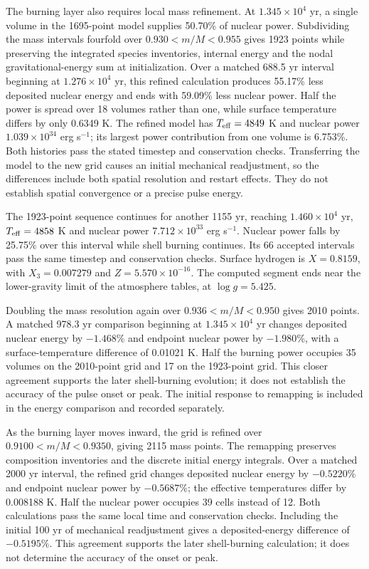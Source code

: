 \documentclass[11pt,letterpaper]{article}
\begin{document}
The burning layer also requires local mass refinement. At
$1.345\times10^4$ yr, a single volume in the 1695-point model supplies
50.70\% of nuclear power. Subdividing the mass intervals fourfold over
$0.930<m/M<0.955$ gives 1923 points while preserving the integrated species
inventories, internal energy and the nodal gravitational-energy sum at
initialization. Over a matched 688.5 yr interval beginning at
$1.276\times10^4$ yr, this refined calculation produces 55.17\% less deposited
nuclear energy and ends with 59.09\% less nuclear power. Half the power is
spread over 18 volumes rather than one, while surface temperature differs
by only 0.6349 K. The refined model has $T_{\rm eff}=4849$ K and nuclear power
$1.039\times10^{34}$ erg s$^{-1}$; its largest power contribution from
one volume is 6.753\%. Both histories pass the stated timestep and conservation
checks. Transferring the model to the new grid causes an initial mechanical
readjustment, so the differences include both spatial resolution and restart
effects. They do not establish spatial convergence or a precise pulse energy.

The 1923-point sequence continues for another 1155 yr, reaching
$1.460\times10^4$ yr, $T_{\rm eff}=4858$ K and nuclear power
$7.712\times10^{33}$ erg s$^{-1}$. Nuclear power falls by 25.75\%
over this interval while shell burning continues. Its 66 accepted intervals
pass the same timestep and conservation checks. Surface hydrogen is
$X=0.8159$, with $X_3=0.007279$ and $Z=5.570\times10^{-16}$.
The computed segment ends near the lower-gravity limit of the atmosphere
tables, at $\log g=5.425$.

Doubling the mass resolution again over $0.936<m/M<0.950$ gives
2010 points. A matched 978.3 yr comparison beginning at
$1.345\times10^4$ yr changes deposited nuclear energy by $-1.468\%$
and endpoint nuclear power by $-1.980\%$, with a surface-temperature
difference of 0.01021 K. Half the burning power occupies 35 volumes
on the 2010-point grid and 17 on the 1923-point grid. This closer agreement
supports the later shell-burning evolution; it does not establish the
accuracy of the pulse onset or peak. The initial response to remapping
is included in the energy comparison and recorded separately.

As the burning layer moves inward, the grid is refined over
$0.9100<m/M<0.9350$, giving 2115 mass points. The remapping preserves
composition inventories and the discrete initial energy integrals.
Over a matched 2000 yr interval, the refined grid changes deposited nuclear
energy by $-0.5220\%$ and endpoint nuclear power by $-0.5687\%$;
the effective temperatures differ by 0.008188 K. Half the nuclear power
occupies 39 cells instead of 12. Both calculations pass the same local
time and conservation checks. Including the initial 100 yr of mechanical
readjustment gives a deposited-energy difference of $-0.5195\%$.
This agreement supports the later shell-burning calculation; it does not
determine the accuracy of the onset or peak.
\end{document}
